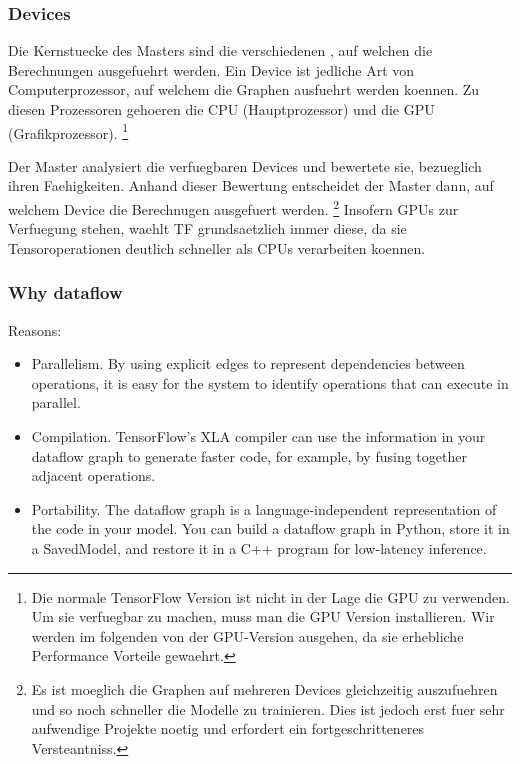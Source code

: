 \subsubsection{Devices}
Die Kernstuecke des Masters sind die verschiedenen , auf
welchen die Berechnungen ausgefuehrt werden. Ein Device ist jedliche Art von
Computerprozessor, auf welchem die Graphen ausfuehrt werden koennen.
Zu diesen Prozessoren gehoeren die CPU (Hauptprozessor) und die GPU (Grafikprozessor).
\footnote{
Die normale TensorFlow Version ist nicht in der Lage die GPU zu verwenden. Um
sie verfuegbar zu machen, muss man die GPU Version installieren. Wir werden im folgenden
von der GPU-Version ausgehen, da sie erhebliche Performance Vorteile gewaehrt.
}
\para{}

Der Master analysiert die verfuegbaren Devices und bewertete sie, bezueglich
ihren Faehigkeiten. Anhand dieser Bewertung entscheidet der Master dann, auf
welchem Device die Berechnugen ausgefuert werden.
\footnote{
  Es ist moeglich die Graphen auf mehreren Devices gleichzeitig auszufuehren und
  so noch schneller die Modelle zu trainieren. Dies ist jedoch erst fuer sehr
  aufwendige Projekte noetig und erfordert ein fortgeschritteneres Versteantniss.
}
Insofern GPUs zur Verfuegung stehen, waehlt TF grundsaetzlich immer diese, da
sie Tensoroperationen deutlich schneller als CPUs verarbeiten koennen.

\subsubsection{Why dataflow}
Reasons:
\begin{itemize}
\item{Parallelism. By using explicit edges to represent dependencies between operations, it is easy for the system to identify operations that can execute in parallel.}
\item{Compilation. TensorFlow's XLA compiler can use the information in your dataflow graph to generate faster code, for example, by fusing together adjacent operations.}
\item{Portability. The dataflow graph is a language-independent representation of the code in your model. You can build a dataflow graph in Python, store it in a SavedModel, and restore it in a C++ program for low-latency inference.}
\end{itemize}

